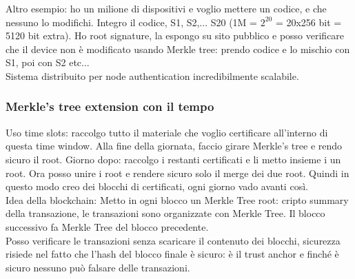\documentclass[16px]{article}
\begin{document}
Altro esempio: ho un milione di dispositivi e voglio mettere un codice, e che nessuno lo modifichi. Integro il codice, S1, S2,... S20 (1M = $2^20$ = 20x256 bit = 5120 bit extra). Ho root signature, la espongo su sito pubblico e posso verificare che il device non è modificato usando Merkle tree: prendo codice e lo mischio con S1, poi con S2 etc...\\ Sistema distribuito per node authentication incredibilmente scalabile.
\subsubsection{Merkle's tree extension con il tempo}
Uso time slots: raccolgo tutto il materiale che voglio certificare all'interno di questa time window. Alla fine della giornata, faccio girare Merkle's tree e rendo sicuro il root. Giorno dopo: raccolgo i restanti certificati e li metto insieme i un root. Ora posso unire i root e rendere sicuro solo il merge dei due root. Quindi in questo modo creo dei blocchi di certificati, ogni giorno vado avanti così.
\\Idea della blockchain: Metto in ogni blocco un Merkle Tree root: cripto summary della transazione, le transazioni sono organizzate con Merkle Tree. Il blocco successivo fa Merkle Tree del blocco precedente.\\ Posso verificare le transazioni senza scaricare il contenuto dei blocchi, sicurezza risiede nel fatto che l'hash del blocco finale è sicuro: è il trust anchor e finché è sicuro nessuno può falsare delle transazioni.
\end{document}
